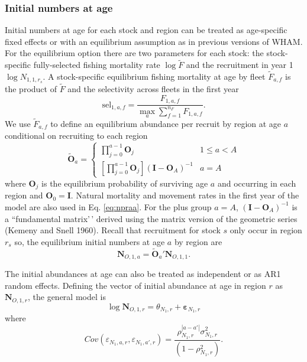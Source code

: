 \documentclass[
]{article}
\begin{document}
\hypertarget{initial-numbers-at-age}{%
\subsubsection*{Initial numbers at age}\label{initial-numbers-at-age}}

Initial numbers at age for each stock and region can be treated as
age-specific fixed effects or with an equilibrium assumption as in
previous versions of WHAM. For the equilibrium option there are two
parameters for each stock: the stock-specific fully-selected fishing
mortality rate \(\log \widetilde{F}\) and the recruitment in year 1
\(\log N_{1,1,r_s}\). A stock-specific equilibrium fishing mortality at
age by fleet \({\tilde F}_{a,f}\) is the product of \(\widetilde{F}\)
and the selectivity across fleets in the first year \begin{equation*}
  \text{sel}_{1,a,f} = \frac{F_{1,a,f}}{\max_a \sum_{f=1}^{n_F} F_{1,a,f}}.
\end{equation*} We use \(\widetilde{F}_{a,f}\) to define an equilibrium
abundance per recruit by region at age \(a\) conditional on recruiting
to each region \begin{equation}\label{eq:npraa}
 \widetilde{\mathbf{O}}_{a} = \left\{
 \begin{array}{ll}
\prod^{a-1}_{j=0}\mathbf{O}_{j}  & 1\leq a<A\\
\left[\prod^{a-1}_{j=0}\mathbf{O}_{j}\right] \left(\mathbf{I} - \mathbf{O}_{A}\right)^{-1} & a = A
 \end{array}
\right.
\end{equation} where \(\mathbf{O}_{j}\) is the equilibrium probability
of surviving age \(a\) and occurring in each region and
\(\mathbf{O}_{0} = \mathbf{I}\). Natural mortality and movement rates in
the first year of the model are also used in Eq. \ref{eq:npraa}. For the
plus group \(a=A\), \(\left(\mathbf{I} - \mathbf{O}_{A}\right)^{-1}\) is
a ``fundamental matrix'\,' derived using the matrix version of the
geometric series (Kemeny and Snell 1960). Recall that recruitment for
stock \(s\) only occur in region \(r_s\) so, the equilibrium initial
numbers at age \(a\) by region are
\[\mathbf{N}_{O,1,a} = \widetilde{\mathbf{O}}_{a}' \mathbf{N}_{O,1,1}.\]

The initial abundances at age can also be treated as independent or as
AR1 random effects. Defining the vector of initial abundance at age in
region \(r\) as \(\mathbf{N}_{O,1,r}\), the general model is
\[\log \mathbf{N}_{O,1,r} = \theta_{N_1,r} + \boldsymbol{\varepsilon}_{N_1,r}\]
where
\[  Cov\left(\varepsilon_{N_1,a,r},\varepsilon_{N_1,a',r}\right) = \frac{\rho_{N_1,r}^{|a-a'|}\sigma^2_{N_1,r}} {\left(1-\rho_{N_1,r}^2\right)}.\]
\end{document}
